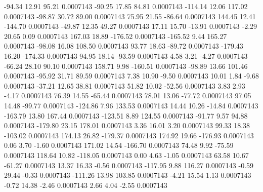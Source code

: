       -94.34       12.91       95.21     0.0007143
      -90.25       17.85       84.81     0.0007143
     -114.14       12.06      117.02     0.0007143
      -98.87       30.72       89.00     0.0007143
       75.95       21.55      -86.64     0.0007143
      144.45       12.41     -144.70     0.0007143
      -49.87       12.35       49.27     0.0007143
       17.11       15.70      -13.91     0.0007143
       -2.29       20.65        0.09     0.0007143
      167.03       18.89     -176.52     0.0007143
     -165.52        9.44      165.27     0.0007143
      -98.08       16.08      108.50     0.0007143
       93.77       18.63      -89.72     0.0007143
     -179.43       16.20     -174.33     0.0007143
       94.95       18.14      -93.59     0.0007143
        4.58        3.21       -4.27     0.0007143
      -66.24       28.10       90.10     0.0007143
      158.71        9.98     -160.51     0.0007143
      -98.89       13.66      101.46     0.0007143
      -95.92       31.71       89.59     0.0007143
        7.38       10.90       -9.50     0.0007143
       10.01        1.84       -9.68     0.0007143
      -37.21       12.65       38.81     0.0007143
       51.82       10.02      -52.56     0.0007143
        3.83        2.93       -4.17     0.0007143
       76.39       14.55      -65.44     0.0007143
       78.01       13.06      -77.72     0.0007143
       97.05       14.48      -99.77     0.0007143
     -124.86        7.96      133.53     0.0007143
       14.44       10.26      -14.84     0.0007143
     -163.79       13.80      167.44     0.0007143
     -123.51        8.89      124.55     0.0007143
      -91.77        9.57       94.88     0.0007143
     -179.80       23.15      178.01     0.0007143
        3.36       16.01        3.20     0.0007143
       99.33       18.38     -103.02     0.0007143
      174.13       26.82     -179.37     0.0007143
      174.92       19.66     -176.93     0.0007143
        0.06        3.70       -1.60     0.0007143
      171.02       14.54     -166.70     0.0007143
       74.48        9.92      -75.59     0.0007143
      118.64       10.82     -118.05     0.0007143
        0.00        4.63       -1.05     0.0007143
       63.58       10.67      -61.27     0.0007143
       13.37       16.33       -0.56     0.0007143
     -117.95        9.88      116.27     0.0007143
       -0.59       29.44       -0.33     0.0007143
     -111.26       13.98      103.85     0.0007143
       -4.21       15.54        1.13     0.0007143
       -0.72       14.38       -2.46     0.0007143
        2.66        4.04       -2.55     0.0007143
